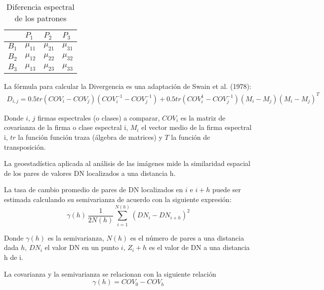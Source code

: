 \begin{table}[h!]
  \centering\begin{tabular}{@{}llll@{}}
  \toprule
        & $P_1$      & $P_2$      & $P_3$      \\ \midrule
  $B_1$ & $\mu_{11}$ & $\mu_{21}$ & $\mu_{31}$ \\
  $B_2$ & $\mu_{12}$ & $\mu_{22}$ & $\mu_{32}$ \\
  $B_3$ & $\mu_{13}$ & $\mu_{23}$ & $\mu_{33}$ \\ \bottomrule
  \end{tabular}
  \caption{Diferencia espectral de los patrones}
  \label{tabt3}
  \end{table}

  La  fórmula para calcular la Divergencia  es una adaptación 
  de Swain et al. (1978):
  \begin{align*}
      D_{i,j} = 0.5 tr \left(COV_i - COV_j\right)\left(COV_i^{ -1} - COV_j^{ - 1}\right) + 0.5tr\left(COV_i^{ 1} - COV_j^{ - 1}\right)\left(M_i - M_j\right)\left(M_i - M_j\right)^{T}
  \end{align*}
  
  Donde $i$, $j$ firmas espectrales (o clases) a comparar, $COV_i$
  es la matriz de covarianza de la firma o clase espectral i,
  $M_i$ el vector medio de la firma espectral  i,
  $tr$ la función función  traza (álgebra de matrices) y 
  $T$ la función de  transposición.
  
  
  La  geoestadística aplicada al análisis de las imágenes mide la 
      similaridad espacial de los pares de valores DN localizados a 
      una distancia h.
  
      La tasa de cambio promedio de pares de DN localizados en 
      $i$ e $i+h$ puede ser estimada calculando su semivarianza de     
  acuerdo con la siguiente expresión:
  \begin{equation}
      \gamma(h)\, \frac{1}{2N(h)}\sum_{i=1}^{N(h)} \left(DN_{i} - DN_{i + h}\right)^2
  \end{equation}
  
  Donde $\gamma(h)$ es la semivarianza, 
  $N(h)$ es el número de pares a una distancia dada $h$, 
  $DN_i$ el valor DN en un punto $i$,  
  $Z_i + h$ es el valor de DN a una distancia h de i. 
  
  La covarianza y la semivarianza se relacionan con la siguiente relación
  \begin{equation}
      \gamma(h) = COV_0 - COV_h
  \end{equation}
  
